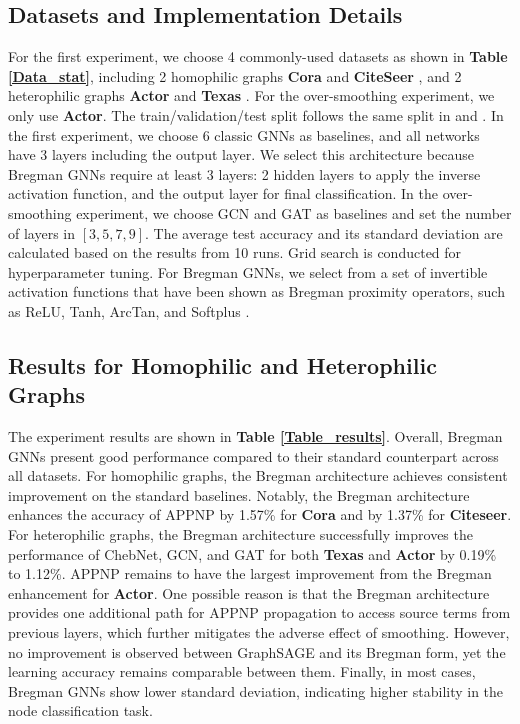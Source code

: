 \documentclass{article}
\begin{document}
\subsection{Datasets and Implementation Details}
For the first experiment, we choose 4 commonly-used datasets as shown in \textbf{Table \ref{Data_stat}}, including 2 homophilic graphs \textbf{Cora} \cite{yang2016revisiting} and \textbf{CiteSeer} \cite{yang2016revisiting}, and 2 heterophilic graphs \textbf{Actor} \cite{Pei2020Geom-GCN} and \textbf{Texas} \cite{Pei2020Geom-GCN}. For the over-smoothing experiment, we only use \textbf{Actor}. 
The train/validation/test split follows the same split in  \cite{yang2016revisiting} and \cite{Pei2020Geom-GCN}.
In the first experiment, we choose 6 classic GNNs as baselines, and all networks have 3 layers including the output layer. We select this architecture because Bregman GNNs require at least 3 layers: 2 hidden layers to apply the inverse activation function, and the output layer for final classification. In the over-smoothing experiment, we choose GCN and GAT as baselines and set the number of layers in $[3, 5, 7, 9]$.
The average test accuracy and its standard deviation are calculated based on the results from 10 runs. Grid search is conducted for hyperparameter tuning.
For Bregman GNNs, we select from a set of invertible activation functions that have been shown as Bregman proximity operators, such as ReLU, Tanh, ArcTan, and Softplus
\cite{frecon2022bregman}.


\subsection{Results for Homophilic and Heterophilic Graphs}
The experiment results are shown in \textbf{Table \ref{Table_results}}. Overall, Bregman GNNs present good performance compared to their standard counterpart across all datasets. For homophilic graphs, the Bregman architecture achieves consistent improvement on the standard baselines. Notably, the Bregman architecture enhances the accuracy of APPNP by 1.57\% for \textbf{Cora} and by 1.37\% for \textbf{Citeseer}. For heterophilic graphs, the Bregman architecture successfully improves the performance of ChebNet, GCN, and GAT for both \textbf{Texas} and \textbf{Actor} by 0.19\% to 1.12\%. APPNP remains to have the largest improvement from the Bregman enhancement for \textbf{Actor}. One possible reason is that the Bregman architecture provides one additional path for APPNP propagation to access source terms from previous layers, which further mitigates the adverse effect of smoothing. However, no improvement is observed between GraphSAGE and its Bregman form, yet the learning accuracy remains comparable between them. Finally, in most cases, Bregman GNNs show lower standard deviation, indicating higher stability in the node classification task.
\end{document}
